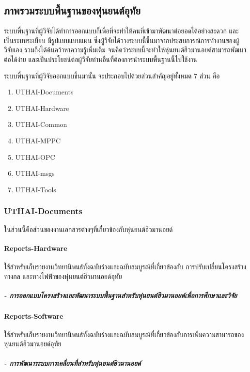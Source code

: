 \clearpage
\subsection{ภาพรวมระบบพื้นฐานของหุ่นยนต์อุทัย}
ระบบพื้นฐานที่ผู้วิจัยได้ทำการออกแบบก็เพื่อที่จะทำให้คนที่เข้ามาพัฒนาต่อยอดได้อย่างสะดวก และเป็นระบบระเบียบ
มีรูปแบบแบบแผน ซึ่งผู้วิจัยได้วางระบบนี้ขึ้นมาจากประสบการณ์การทำงานของผู้วิจัยเอง รวมถึงได้ค้นคว้าหาความรู้เพิ่มเติม
จนคิดว่าระบบนี้จะทำให้หุ่นยนต์ฮิวมานอยด์สามารถพัฒนาต่อได้ง่าย และเป็นประโยชน์ต่อผู้วิจัยท่านอื่นที่ต้องการนำระบบพื้นฐานนี้ไปใช้งาน

ระบบพื้นฐานที่ผู้วิจัยออกแบบขึ้นมานั้น จะประกอบไปด้วยส่วนสำคัญอยู่ทั้งหมด 7 ส่วน คือ
\vspace{-10pt}
\begin{enumerate}[label=\arabic*., leftmargin=2.5cm]
    \setlength\itemsep{-0.25em}
    \item UTHAI-Documents
    \item UTHAI-Hardware
    \item UTHAI-Common
    \item UTHAI-MPPC
    \item UTHAI-OPC
    \item UTHAI-msgs
    \item UTHAI-Tools
\end{enumerate}

\clearpage
\subsubsection*{UTHAI-Documents}
ในส่วนนี้คือส่วนของงานเอกสารต่างๆที่เกี่ยวข้องกับหุ่นยนต์ฮิวมานอยด์

\paragraph*{Reports-Hardware}
ใช้สำหรับเก็บรายงานวิทยานิพนธ์ทั้งฉบับร่างและฉบับสมบูรณ์ที่เกี่ยวข้องกับ การปรับเปลี่ยนโครงสร้างทางกล และทางไฟฟ้าของหุ่นยนต์ฮิวมานอยด์อุทัย
\subparagraph*{- การออกแบบโครงสร้างและพัฒนาระบบพื้นฐานสำหรับหุ่นยนต์ฮิวมานอยด์เพื่อการศึกษาและวิจัย}

\paragraph*{Reports-Software}
ใช้สำหรับเก็บรายงานวิทยานิพนธ์ทั้งฉบับร่างและฉบับสมบูรณ์ที่เกี่ยวข้องกับการเพิ่มความสามารถของหุ่นยนต์ฮิวมานอยด์อุทัย
\subparagraph*{- การพัฒนาระบบการเคลื่อนที่สำหรับหุ่นยนต์ฮิวมานอยด์}


